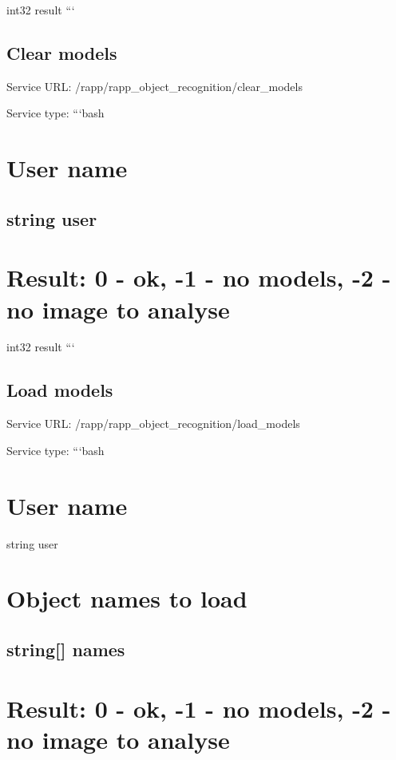 int32 result ```

\subsection*{Clear models}

Service U\-R\-L\-: {\ttfamily /rapp/rapp\-\_\-object\-\_\-recognition/clear\-\_\-models}

Service type\-: ```bash \section*{User name}

\subsection*{string user }

\section*{Result\-: 0 -\/ ok, -\/1 -\/ no models, -\/2 -\/ no image to analyse}

int32 result ```

\subsection*{Load models}

Service U\-R\-L\-: {\ttfamily /rapp/rapp\-\_\-object\-\_\-recognition/load\-\_\-models}

Service type\-: ```bash \section*{User name}

string user \section*{Object names to load}

\subsection*{string\mbox{[}\mbox{]} names }

\section*{Result\-: 0 -\/ ok, -\/1 -\/ no models, -\/2 -\/ no image to analyse}

